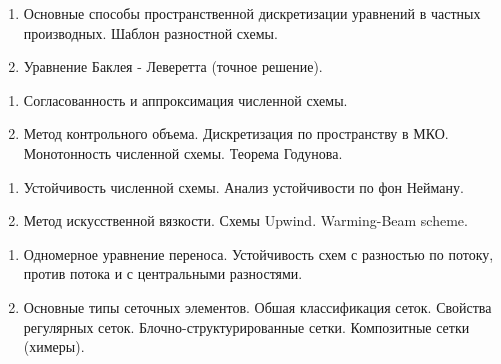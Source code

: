 \documentclass[14pt,a4paper]{extarticle}
\begin{document}

    \begin{enumerate}

        \item Основные способы пространственной дискретизации уравнений в частных производных. Шаблон разностной схемы.

        \item Уравнение Баклея - Леверетта (точное решение).

    \end{enumerate}


    \begin{enumerate}

        \item Согласованность и аппроксимация численной схемы.

        \item Метод контрольного объема. Дискретизация по пространству в МКО. Монотонность численной схемы. Теорема Годунова.

    \end{enumerate}


    \begin{enumerate}

         \item Устойчивость численной схемы. Анализ устойчивости по фон Нейману.

         \item Метод искусственной вязкости. Схемы Upwind. Warming-Beam scheme.

    \end{enumerate}


    \begin{enumerate}

         \item Одномерное уравнение переноса. Устойчивость схем с разностью по потоку, против потока и с центральными разностями.

         \item Основные типы сеточных элементов. Обшая классификация сеток. Свойства регулярных сеток. Блочно-структурированные сетки. Композитные сетки (химеры).

    \end{enumerate}

\end{document}
